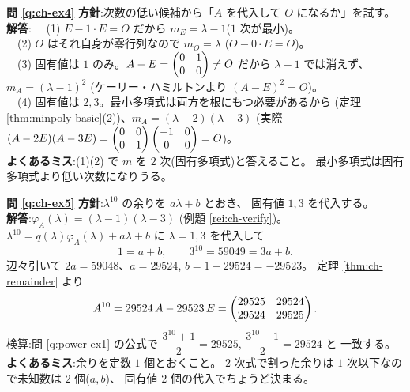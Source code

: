 \bigskip
\noindent\textbf{問 \ref{q:ch-ex4}}\quad
\textbf{方針}:次数の低い候補から「$A$ を代入して $O$ になるか」を試す。\\
\textbf{解答}:
　(1) $E - 1 \cdot E = O$ だから $m_E = \lambda - 1$($1$ 次が最小)。\\
　(2) $O$ はそれ自身が零行列なので $m_O = \lambda$
($O - 0 \cdot E = O$)。\\
　(3) 固有値は $1$ のみ。$A - E = \begin{pmatrix}0 & 1 \\ 0 & 0\end{pmatrix} \neq O$ だから
$\lambda - 1$ では消えず、$m_A = (\lambda - 1)^2$
(ケーリー・ハミルトンより $(A - E)^2 = O$)。\\
　(4) 固有値は $2, 3$。最小多項式は両方を根にもつ必要があるから
(定理 \ref{thm:minpoly-basic}(2))、$m_A = (\lambda - 2)(\lambda - 3)$
(実際 $(A - 2E)(A - 3E) = \begin{pmatrix}0 & 0 \\ 0 & 1\end{pmatrix}\begin{pmatrix}-1 & 0 \\ 0 & 0\end{pmatrix} = O$)。\\
\textbf{よくあるミス}:(1)(2) で $m$ を $2$ 次(固有多項式)と答えること。
最小多項式は固有多項式より低い次数になりうる。

\bigskip
\noindent\textbf{問 \ref{q:ch-ex5}}\quad
\textbf{方針}:$\lambda^{10}$ の余りを $a\lambda + b$ とおき、
固有値 $1, 3$ を代入する。\\
\textbf{解答}:$\varphi_A(\lambda) = (\lambda - 1)(\lambda - 3)$
(例題 \ref{rei:ch-verify})。
$\lambda^{10} = q(\lambda)\varphi_A(\lambda) + a\lambda + b$ に
$\lambda = 1, 3$ を代入して
\[
1 = a + b, \qquad 3^{10} = 59049 = 3a + b.
\]
辺々引いて $2a = 59048$、$a = 29524$, $b = 1 - 29524 = -29523$。
定理 \ref{thm:ch-remainder} より
\[
A^{10} = 29524\,A - 29523\,E
= \begin{pmatrix}29525 & 29524 \\ 29524 & 29525\end{pmatrix}.
\]
検算:問 \ref{q:power-ex1} の公式で
$\dfrac{3^{10} + 1}{2} = 29525$, $\dfrac{3^{10} - 1}{2} = 29524$ と
一致する。\\
\textbf{よくあるミス}:余りを定数 $1$ 個とおくこと。
$2$ 次式で割った余りは $1$ 次以下なので未知数は $2$ 個($a, b$)、
固有値 $2$ 個の代入でちょうど決まる。

